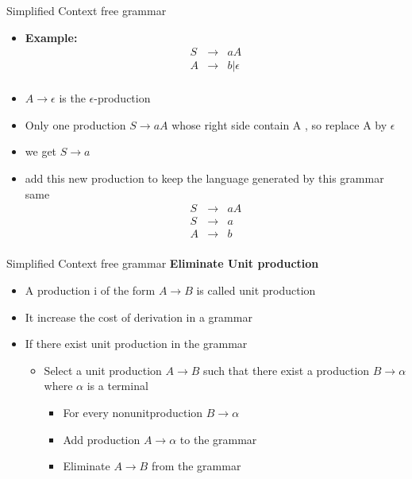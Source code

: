 \documentclass{beamer}
\begin{document}
\begin{frame}{Simplified Context free grammar}
	\begin{itemize}
		\item \textbf{Example:}
		\begin{eqnarray*}
			S&\rightarrow& aA\\
			A&\rightarrow& b|\epsilon\\
		\end{eqnarray*}
\item	$A\rightarrow\epsilon	$ is the $\epsilon$-production
\item Only one production $S\rightarrow aA$ whose right side contain A , so replace A by $\epsilon$
\item we get $S\rightarrow a$
\item add this new production to keep the language generated by this grammar same
\begin{eqnarray*}
	S&\rightarrow& aA\\
	S&\rightarrow& a\\
	A&\rightarrow& b\\
\end{eqnarray*}
	\end{itemize}	
\end{frame}
\begin{frame}{Simplified Context free grammar}
	\textbf{Eliminate Unit production}
	\begin{itemize}
		\item A production i of the form $A\rightarrow B$ is called unit production
		\item It increase the cost of derivation in a grammar
		\item If there exist  unit production in the grammar
		\begin{itemize}
			\item Select a unit production $A\rightarrow B$ such that there exist a production $B\rightarrow \alpha$ where $\alpha$ is a terminal
			\begin{itemize}
			\item For every nonunitproduction $B\rightarrow \alpha$
			\item Add production $A\rightarrow \alpha$ to the grammar
			\item Eliminate $A\rightarrow B$ from the grammar
		\end{itemize}
		\end{itemize}
	\end{itemize}	
\end{frame}
\end{document}
